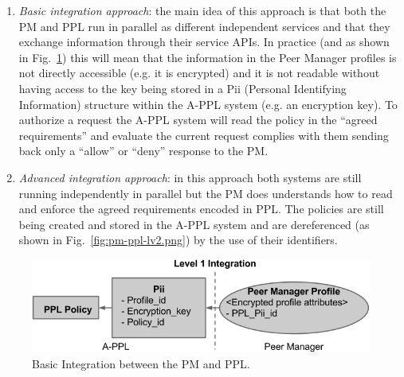 \begin{enumerate}
	\item \emph{Basic integration approach}: the main idea of this approach is that both the PM and PPL run in parallel as different independent services and that they exchange information through their service APIs. In practice (and as shown in Fig.~\ref{fig:pm-ppl-lv1.png}) this will mean that the information in the Peer Manager profiles is not directly accessible (e.g. it is encrypted) and it is not readable without having access to the key being stored in a Pii (Personal Identifying Information) structure within the A-PPL system  (e.g. an encryption key). To authorize a request the A-PPL system will read the policy in the ``agreed requirements'' and evaluate the current request complies with them sending back only a ``allow'' or ``deny'' response to the PM. 
	\item \emph{Advanced integration approach}: in this approach both systems are still running independently in parallel  but the PM does understands how to read and enforce the agreed requirements encoded in PPL. The policies are still being created and stored in the A-PPL system and are dereferenced (as shown in Fig.~\ref{fig:pm-ppl-lv2.png}) by the use of their identifiers.
\end{enumerate}

\begin{figure}[htb!]
\centering
\includegraphics[width=0.8\linewidth]{figures/pm-ppl-lv1.png}
\caption{Basic Integration between the PM and PPL.}
\label{fig:pm-ppl-lv1.png}
\end{figure}

